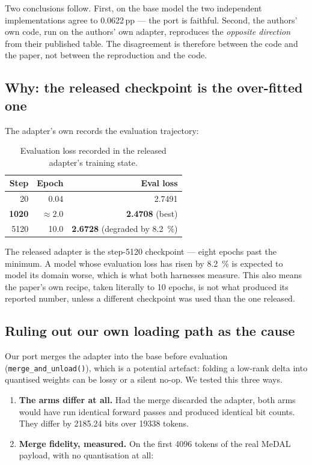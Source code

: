 \documentclass[11pt,a4paper]{article}
\newcommand{\code}[1]{\texttt{\small #1}}
\newcommand{\file}[1]{\texttt{\footnotesize\detokenize{#1}}}
\begin{document}
Two conclusions follow. First, on the base model the two independent
implementations agree to \num{0.0622}\,pp --- the port is faithful. Second, the
authors' own code, run on the authors' own adapter, reproduces the
\emph{opposite direction} from their published table. The disagreement is
therefore between the code and the paper, not between the reproduction and the
code.

\subsection{Why: the released checkpoint is the over-fitted one}

The adapter's own \file{trainer\_state.json} records the evaluation trajectory:

\begin{table}[htbp]
\centering
\small
\caption{Evaluation loss recorded in the released adapter's training state.}
\label{tab:trainer}
\begin{tabular}{rrr}
\toprule
Step & Epoch & Eval loss \\
\midrule
20 & 0.04 & 2.7491 \\
\textbf{1020} & $\approx 2.0$ & \textbf{2.4708} (best) \\
5120 & 10.0 & \textbf{2.6728} (degraded by \SI{8.2}{\%}) \\
\bottomrule
\end{tabular}
\end{table}

The released adapter is the step-\num{5120} checkpoint --- eight epochs past the
minimum. A model whose evaluation loss has risen by \SI{8.2}{\%} is
expected to model its domain worse, which is what both harnesses measure. This
also means the paper's own recipe, taken literally to 10 epochs, is not what
produced its reported number, unless a different checkpoint was used than the one
released.

\subsection{Ruling out our own loading path as the cause}

Our port merges the adapter into the base before evaluation
(\code{merge\_and\_unload()}), which is a potential artefact: folding a low-rank
delta into quantised weights can be lossy or a silent no-op. We tested this three
ways.

\begin{enumerate}[leftmargin=1.4em,itemsep=2pt]
\item \textbf{The arms differ at all.} Had the merge discarded the adapter, both
      arms would have run identical forward passes and produced identical bit
      counts. They differ by \num{2185.24} bits over \num{19338} tokens.
\item \textbf{Merge fidelity, measured.} On the first \num{4096} tokens of the
      real MeDAL payload, with no quantisation at all:
\end{enumerate}
\end{document}
